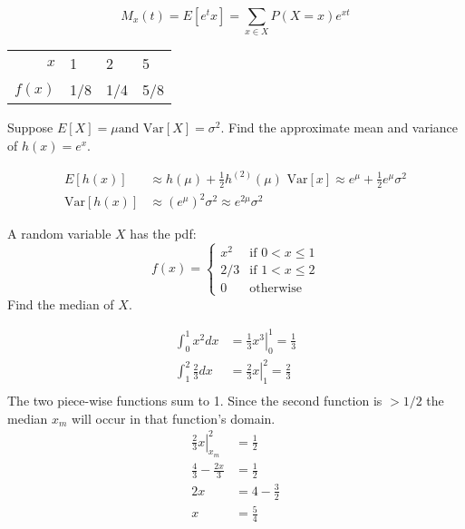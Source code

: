 \documentclass[answers]{exam}
\begin{document}
\begin{questions}
\begin{solution}
	$$
	M_x(t) = E[e^tx] = \sum_{x\in X}P(X=x)e^{xt}
	$$
	\begin{tabular}{r|lll}
		$x$ & 1 & 2 & 5 \\
		$f(x)$ & 1/8 & 1/4 & 5/8 
	\end{tabular}
\end{solution}

\question
Suppose $E[X]= \mu \text{and Var}[X] = \sigma^2$. Find the approximate mean and variance of $h(x) = e^x$.

\begin{solution}
	\begin{align*}
		E[h(x)] &\approx h(\mu)+\frac{1}{2}h^{(2)}(\mu)\text{ Var}[x] \approx e^\mu+\frac{1}{2}e^\mu\sigma^2 \\
		\text{Var}[h(x)] &\approx (e^\mu)^2\sigma^2 \approx e^{2\mu}\sigma^2
	\end{align*}
\end{solution}

\question
A random variable $X$ has the pdf:
$$
f(x) =
\begin{cases}
	x^2 & \text{if } 0<x\leq1 \\
	2/3 & \text{if } 1<x\leq2 \\
	0 & \text{otherwise} 
\end{cases}
$$ 
Find the median of $X$.

\begin{solution}
	\begin{align*}
		\int_{0}^{1}x^2dx &= \left. \frac{1}{3}x^3 \right|_0^1 = \frac{1}{3} \\
		\int_{1}^{2}\frac{2}{3}dx &= \left. \frac{2}{3}x \right|_1^2 = \frac{2}{3} \\
	\end{align*}
	The two piece-wise functions sum to 1. Since the second function is $>1/2$ the median $x_m$ will occur in that function's domain.
	\begin{align*}
		\left. \frac{2}{3}x \right|_{x_m}^2 &= \frac{1}{2} \\
		\frac{4}{3} - \frac{2x}{3} &= \frac{1}{2} \\
		2x &= 4 - \frac{3}{2} \\
		x &= \frac{5}{4} 
	\end{align*}
\end{solution}

\end{questions}
\end{document}
